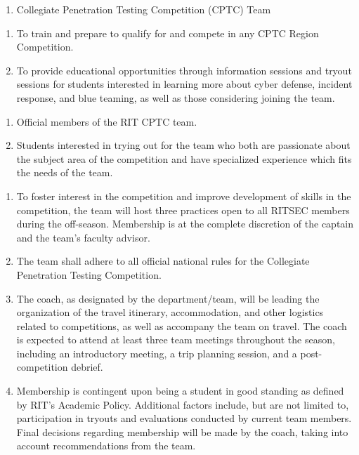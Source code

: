 

\begin{enumerate}
	\item Collegiate Penetration Testing Competition (CPTC) Team
\end{enumerate}


\begin{enumerate}
	\item To train and prepare to qualify for and compete in any CPTC Region Competition.
      \item To provide educational opportunities through information sessions and tryout sessions 
            for students interested in learning more about cyber defense, incident response, and blue 
            teaming, as well as those considering joining the team.
\end{enumerate}


\begin{enumerate}
	\item Official members of the RIT CPTC team.
      \item Students interested in trying out for the team who both are passionate about the subject area 
            of the competition and have specialized experience which fits the needs of the team.
\end{enumerate}


\begin{enumerate}
\item To foster interest in the competition and improve development of skills in the competition, the team 
      will host three practices open to all RITSEC members during the off-season. Membership is at the complete 
      discretion of the captain and the team’s faculty advisor.
\item The team shall adhere to all official national rules for the Collegiate Penetration Testing Competition.
\item The coach, as designated by the department/team, will be leading the organization of the travel itinerary, 
      accommodation, and other logistics related to competitions, as well as accompany the team on travel. The 
      coach is expected to attend at least three team meetings throughout the season, including an introductory 
      meeting, a trip planning session, and a post-competition debrief.
\item Membership is contingent upon being a student in good standing as defined by RIT’s Academic Policy. Additional 
      factors include, but are not limited to, participation in tryouts and evaluations conducted by current team 
      members. Final decisions regarding membership will be made by the coach, taking into account recommendations 
      from the team.

\end{enumerate}